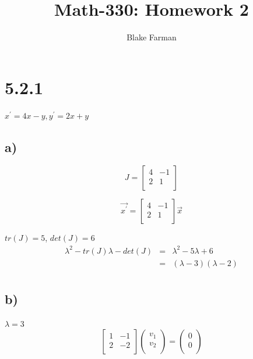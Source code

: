 \documentclass[12pt]{article}
\author{Blake Farman}
\title{Math-330: Homework 2}
\begin{document}
\maketitle
\newpage
\section*{5.2.1}
\(x^{'} = 4x-y, y^{'} = 2x + y\)

\subsection*{a)}
\begin{displaymath}
  J = \left[
  \begin{array}{cc}
    4 & -1\\
    2 & 1\\
    \end{array}
  \right]
\end{displaymath}

\begin{displaymath}
  \vec{x^{'}} = \left[
    \begin{array}{cc}
      4 & -1\\
      2 & 1\\
    \end{array}
    \right]
  \vec{x}
\end{displaymath}

\(tr(J) = 5\), \(det(J) = 6\)\\
\begin{eqnarray*}
  \lambda^2 - tr(J)\lambda - det(J) & = & \lambda^2 -5\lambda + 6\\
  &= & (\lambda - 3)(\lambda - 2)\\
\end{eqnarray*}

\subsection*{b)}

\(\lambda = 3\)
\begin{displaymath}
  \left[
    \begin{array}{cc}
      1 & -1\\
      2 & -2\\
    \end{array}
    \right]
  \left(
  \begin{array}{c}
    v_1\\
    v_2\\
  \end{array}
  \right)
  =
  \left(
  \begin{array}{c}
    0\\
    0\\
  \end{array}
  \right)
\end{displaymath}
\end{document}

